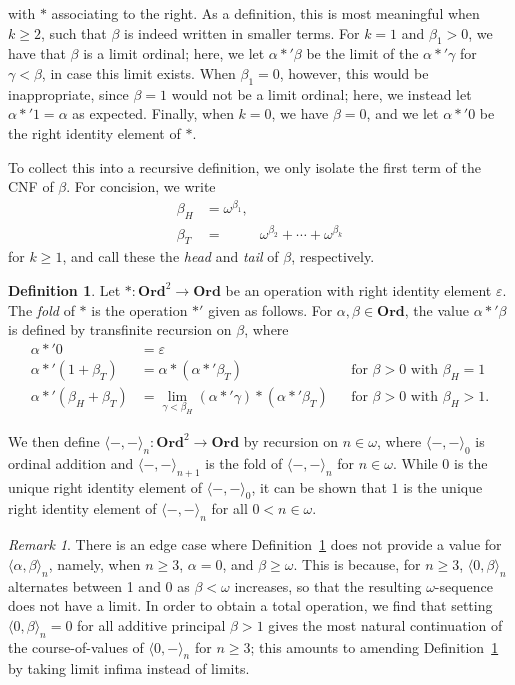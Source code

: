 \documentclass[12pt, a4paper]{article}
\theoremstyle{definition}
\newtheorem{definition}[theorem]{Definition}
\theoremstyle{remark}
\newtheorem{remark}[theorem]{Remark}
\newcommand{\ord}{\mathbf{Ord}}
\newcommand{\op}[2]{\langle#1, #2\rangle}
\begin{document}
with $*$ associating to the right. As a definition, this is most meaningful when $k \geq 2$, such that $\beta$ is indeed written in smaller terms. For $k = 1$ and $\beta_1 > 0$, we have that $\beta$ is a limit ordinal; here, we let $\alpha *' \beta$ be the limit of the $\alpha *' \gamma$ for $\gamma < \beta$, in case this limit exists. When $\beta_1 = 0$, however, this would be inappropriate, since $\beta = 1$ would not be a limit ordinal; here, we instead let $\alpha *' 1 = \alpha$ as expected. Finally, when $k = 0$, we have $\beta = 0$, and we let $\alpha *' 0$ be the right identity element of $*$.

To collect this into a recursive definition, we only isolate the first term of the CNF of $\beta$. For concision, we write
\begin{align*}
    \beta_H &= \omega^{\beta_1}, \\
    \beta_T &= \phantom{\omega^{\beta_1} +} \omega^{\beta_2} + \cdots + \omega^{\beta_k}
\end{align*}
for $k \geq 1$, and call these the \emph{head} and \emph{tail} of $\beta$, respectively.

\begin{definition}\label{def:fold}
    Let $* : \ord^2 \to \ord$ be an operation with right identity element $\varepsilon$. The \emph{fold} of $*$ is the operation $*'$ given as follows. For $\alpha, \beta \in \ord$, the value $\alpha *' \beta$ is defined by transfinite recursion on $\beta$, where
    \begin{align*}
        \alpha *' 0 &= \varepsilon\\
        \alpha *' (1+\beta_T) &= \alpha * (\alpha *' \beta_T) &&\text{for }\beta > 0\text{ with }\beta_H = 1\\
        \alpha *' (\beta_H + \beta_T) &= \lim_{\gamma<\beta_H} (\alpha *' \gamma) * (\alpha *' \beta_T) && \text{for }\beta > 0\text{ with }\beta_H > 1.
    \end{align*}
\end{definition}

We then define $\op--_n : \ord^2 \to \ord$ by recursion on $n \in \omega$, where $\op--_0$ is ordinal addition and $\op--_{n+1}$ is the fold of $\op--_n$ for $n \in \omega.$ While 0 is the unique right identity element of $\op--_0$, it can be shown that $1$ is the unique right identity element of $\op--_n$ for all $0 < n \in \omega$.

\begin{remark}
    There is an edge case where Definition~\ref{def:fold} does not provide a value for $\op\alpha\beta_n$, namely, when $n \geq 3$, $\alpha = 0$, and $\beta \geq \omega$. This is because, for $n \geq 3$, $\op0\beta_n$ alternates between 1 and 0 as $\beta < \omega$ increases, so that the resulting $\omega$-sequence does not have a limit. In order to obtain a total operation, we find that setting $\op0\beta_n = 0$ for all additive principal $\beta > 1$ gives the most natural continuation of the course-of-values of $\op0-_n$ for $n \geq 3$; this amounts to amending Definition~\ref{def:fold} by taking limit infima instead of limits.
\end{remark}
\end{document}
